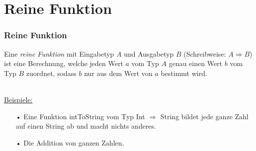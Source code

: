 	\section[Section]{Reine Funktion}
	\begin{frame}
		\frametitle{Reine Funktion}
		\begin{definition}
			Eine \emph{reine Funktion} mit Eingabetyp $A$ und Ausgabetyp $B$ (Schreibweise: $A				\Rightarrow B$)
			ist eine Berechnung, welche jeden Wert $a$ vom Typ $A$ genau einen Wert 			$b$ vom Typ $B$ zuordnet, sodass $b$ nur aus dem Wert von $a$ bestimmt 				wird.
		\end{definition} 
		\leavevmode \\
		\underline{Beispiele:}
		\begin{itemize}
		\item[•] Eine Funktion intToString vom Typ Int $\Rightarrow$ String bildet 
		jede ganze Zahl auf einen String ab und macht nichts anderes.
		\item[•] Die Addition von ganzen Zahlen. 
		\end{itemize}
	\end{frame}
	